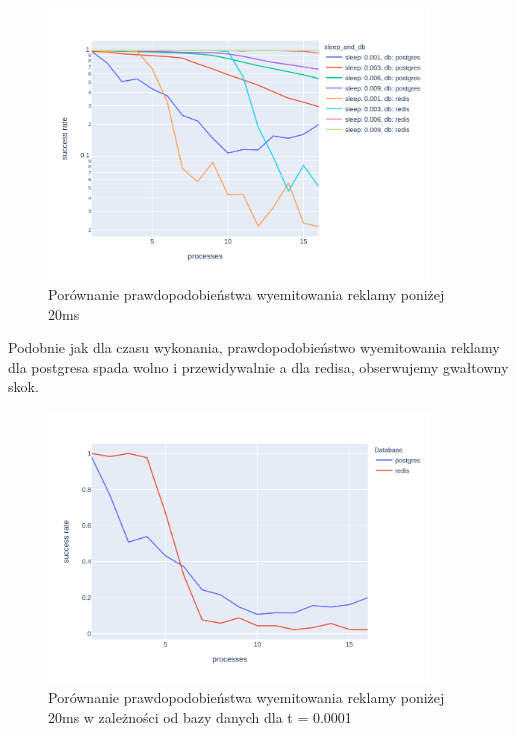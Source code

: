 \documentclass[polish, 10pt]{article}
\begin{document}
\begin{figure}[H]
    \centering
    \includegraphics[width=0.9\textwidth]{./graphs/success_rate_all_sleeps.png}
    \caption{Porównanie prawdopodobieństwa wyemitowania reklamy poniżej 20ms}
\end{figure}

Podobnie jak dla czasu wykonania, prawdopodobieństwo wyemitowania reklamy dla postgresa spada wolno i przewidywalnie a dla redisa, obserwujemy gwałtowny skok.

\begin{figure}[H]
    \centering
    \includegraphics[width=0.9\textwidth]{./graphs/success_rate_postgres_vs_redis_0001.png}
    \caption{Porównanie prawdopodobieństwa wyemitowania reklamy poniżej 20ms w zależności od bazy danych dla t = 0.0001}
\end{figure}
\end{document}
